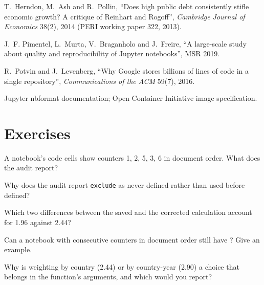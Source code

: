 \begin{omsources}
\item T.~Herndon, M.~Ash and R.~Pollin, ``Does high public debt consistently stifle economic growth? A critique of Reinhart and Rogoff'',
\emph{Cambridge Journal of Economics} 38(2), 2014 (PERI working paper 322, 2013).
\item J.~F. Pimentel, L.~Murta, V.~Braganholo and J.~Freire, ``A large-scale study about quality and reproducibility of Jupyter
notebooks'', MSR 2019.
\item R.~Potvin and J.~Levenberg, ``Why Google stores billions of lines of code in a single repository'', \emph{Communications of the ACM}
59(7), 2016.
\item Jupyter nbformat documentation; Open Container Initiative image specification.
\end{omsources}

\section{Exercises}

\begin{exercise}[$\star$]\label{exo:pl:the-research-environment:1}
A notebook's code cells show counters 1, 2, 5, 3, 6 in document order. What does the audit report?
\end{exercise}

\begin{exercise}[$\star$]\label{exo:pl:the-research-environment:2}
Why does the audit report \texttt{exclude} as never defined rather than used before defined?
\end{exercise}

\begin{exercise}[$\star$]\label{exo:pl:the-research-environment:3}
Which two differences between the saved and the corrected calculation account for 1.96 against 2.44?
\end{exercise}

\begin{exercise}[$\star\star$]\label{exo:pl:the-research-environment:4}
Can a notebook with consecutive counters in document order still have ? Give an example.
\end{exercise}

\begin{exercise}[$\star\star$]\label{exo:pl:the-research-environment:5}
Why is weighting by country (2.44) or by country-year (2.90) a choice that belongs in the function's arguments, and which would you report?
\end{exercise}

